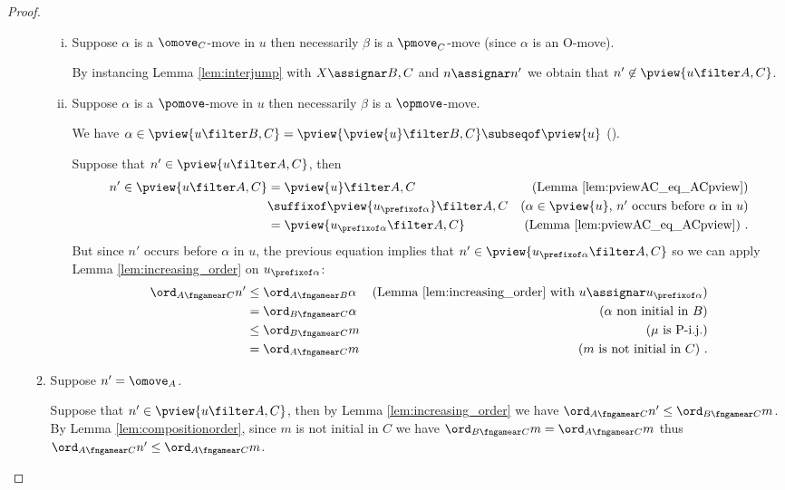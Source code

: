 \begin{proof}
\begin{enumerate}[(1)]
\begin{enumerate}
\begin{enumerate}[(i)]
\item Suppose $\alpha$ is a $\omove_C$-move in $u$ then necessarily
$\beta$ is a $\pmove_C$-move (since $\alpha$ is an O-move).

By instancing Lemma \ref{lem:interjump} with
$X\assignar B,C$ and $n \assignar n'$ we obtain that $n' \not\in\pview{u \filter A,C}$.

\item Suppose $\alpha$ is a $\pomove$-move in $u$ then necessarily $\beta$ is a $\opmove$-move.

We have $\alpha \in \pview{u \filter B,C}
= \pview{\pview{u} \filter B,C} \subseqof
\pview{u}$ (\cite[Lemma 3.3.1]{Harmer2005}).

Suppose that $n' \in \pview{u\filter A,C}$, then 
\begin{align*}
n'  \in \pview{u\filter A,C} 
& = \pview{u}\filter A,C   
& \mbox{(Lemma \ref{lem:pviewAC_eq_ACpview})} \\
& \suffixof \pview{u_{\prefixof \alpha}}\filter A,C
& \mbox{($\alpha \in \pview{u}$, $n'$ occurs before $\alpha$ in $u$)} \\
& = \pview{u_{\prefixof \alpha} \filter A,C} 
& \mbox{(Lemma \ref{lem:pviewAC_eq_ACpview})}\ .
\end{align*}
But since $n'$ occurs before $\alpha$ in $u$, the previous equation 
implies that $n' \in \pview{u_{\prefixof \alpha}\filter A,C}$
so we can apply Lemma \ref{lem:increasing_order}
on $u_{\prefixof \alpha}$: 
\begin{align*}
\ord_{A\fngamear C} n' 
& \leq \ord_{A\fngamear B} \alpha & \mbox{(Lemma \ref{lem:increasing_order} with $u\assignar u_{\prefixof \alpha}$)} \\
& = \ord_{B\fngamear C} \alpha & \mbox{($\alpha$ non initial in $B$)} \\
& \leq \ord_{B\fngamear C} m & \mbox{($\mu$ is P-i.j.)} \\
& = \ord_{A\fngamear C} m & \mbox{($m$ is not initial in $C$)} \ .
\end{align*}
\end{enumerate}


\item Suppose $n' =\omove_A$.

Suppose that $n' \in \pview{u\filter A,C}$, then by
Lemma \ref{lem:increasing_order} we have
$ \ord_{A\fngamear C} n'  \leq \ord_{B\fngamear C} m$.
 By Lemma \ref{lem:compositionorder}, since
 $m$ is not initial in $C$ we have $\ord_{B\fngamear C} m = \ord_{A\fngamear C} m$ thus $\ord_{A\fngamear C} n' \leq \ord_{A\fngamear C} m$.
\end{enumerate}


\end{enumerate}
\end{proof}
